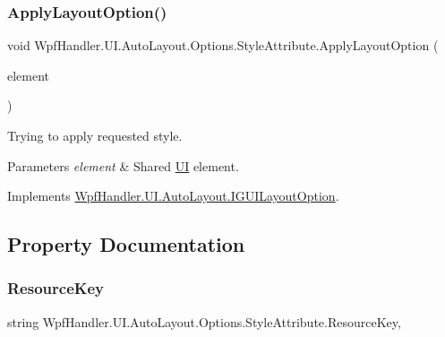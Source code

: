 \subsubsection{\texorpdfstring{Apply\+Layout\+Option()}{ApplyLayoutOption()}}
{\footnotesize\ttfamily void Wpf\+Handler.\+U\+I.\+Auto\+Layout.\+Options.\+Style\+Attribute.\+Apply\+Layout\+Option (\begin{DoxyParamCaption}\item[{Framework\+Element}]{element }\end{DoxyParamCaption})}



Trying to apply requested style. 


\begin{DoxyParams}{Parameters}
{\em element} & Shared \mbox{\hyperlink{namespace_wpf_handler_1_1_u_i}{UI}} element.\\
\hline
\end{DoxyParams}


Implements \mbox{\hyperlink{interface_wpf_handler_1_1_u_i_1_1_auto_layout_1_1_i_g_u_i_layout_option_ac2d2fa8aeaf753b3248381399f991005}{Wpf\+Handler.\+U\+I.\+Auto\+Layout.\+I\+G\+U\+I\+Layout\+Option}}.



\subsection{Property Documentation}
\mbox{\label{class_wpf_handler_1_1_u_i_1_1_auto_layout_1_1_options_1_1_style_attribute_a25d5446eb9674e30cf46c642734648fa}} 
\subsubsection{\texorpdfstring{Resource\+Key}{ResourceKey}}
{\footnotesize\ttfamily string Wpf\+Handler.\+U\+I.\+Auto\+Layout.\+Options.\+Style\+Attribute.\+Resource\+Key\hspace{0.3cm}{\ttfamily [get]}, {\ttfamily [set]}}



